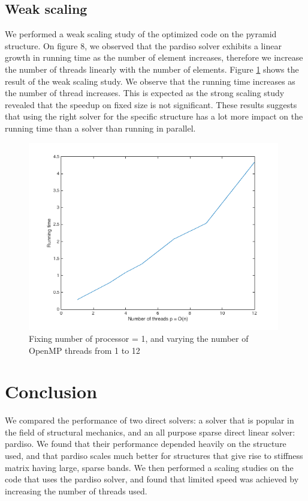 \documentclass[11pt]{article}
\begin{document}
\subsection{Weak scaling}
We performed a weak scaling study of the optimized code on the pyramid structure. On figure 8, we observed that the pardiso solver exhibits a linear growth in running time as the number of element increases, therefore we increase the number of threads linearly with the number of elements. Figure \ref{fig:weakplot} shows the result of the weak scaling study. We observe that the running time increases as the number of thread increases. This is expected as the strong scaling study revealed that the speedup on fixed size is not significant. These results suggests that using the right solver for the specific structure has a lot more impact on the running time than a solver than running in parallel.

\begin{figure}[H]
	\begin{center}
		\includegraphics[width=11cm]{weakplot}
		\caption{Fixing number of processor = 1, and varying the number of OpenMP threads from 1 to 12 }
		\label{fig:weakplot}
	\end{center}
\end{figure}

\section{Conclusion}\label{sec:conclusion}
We compared the performance of two direct solvers: a solver that is popular in the field of structural mechanics, and an all purpose sparse direct linear solver: pardiso. We found that their performance depended heavily on the structure used, and that pardiso scales much better for structures that give rise to stiffness matrix having large, sparse bands. We then performed a scaling studies on the code that uses the pardiso solver, and found that limited speed was achieved by increasing the number of threads used. 
\end{document}
